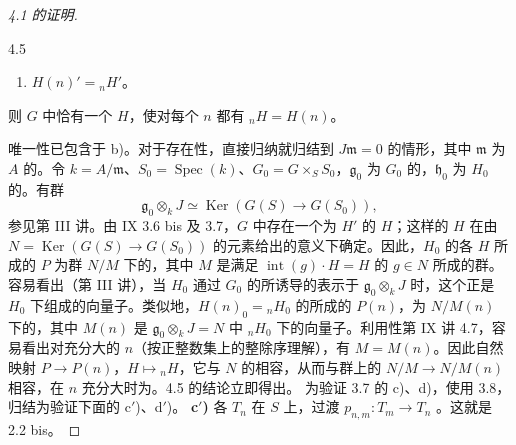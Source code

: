 \begin{proof}[ 4.1 的证明]
\begin{SGAresult}{}{4.5}
\begin{enumerate}
\item[$2^\circ$)] $H(n)'={}_nH'$。
\end{enumerate}
则 $G$ 中恰有一个 $H$，使对每个 $n$ 都有 ${}_nH=H(n)$。
\end{SGAresult}
唯一性已包含于 b)。对于存在性，直接归纳就归结到 $J\mathfrak m=0$ 的情形，其中 $\mathfrak m$ 为 $A$ 的。令 $k=A/\mathfrak m$、$S_0=\operatorname{Spec}(k)$、$G_0=G\times_S S_0$，$\mathfrak g_0$ 为 $G_0$ 的，$\mathfrak h_0$ 为 $H_0$ 的。有群
\[\mathfrak g_0\otimes_k J\simeq\operatorname{Ker}(G(S)\longrightarrow G(S_0)),\]
参见第 III 讲。由 IX 3.6 bis 及 3.7，$G$ 中存在一个为 $H'$ 的 $H$；这样的 $H$ 在由 $N=\operatorname{Ker}(G(S)\to G(S_0))$ 的元素给出的意义下确定。因此，$H_0$ 的各 $H$ 所成的 $P$ 为群 $N/M$ 下的，其中 $M$ 是满足 $\operatorname{int}(g)\cdot H=H$ 的 $g\in N$ 所成的群。
容易看出（第 III 讲），当 $H_0$ 通过 $G_0$ 的所诱导的表示于 $\mathfrak g_0\otimes_k J$ 时，这个正是 $H_0$ 下组成的向量子。类似地，$H(n)_0={}_nH_0$ 的所成的 $P(n)$，为 $N/M(n)$ 下的，其中 $M(n)$ 是 $\mathfrak g_0\otimes_k J=N$ 中 ${}_nH_0$ 下的向量子。利用性第 IX 讲 4.7，容易看出对充分大的 $n$（按正整数集上的整除序理解），有 $M=M(n)$。因此自然映射 $P\to P(n)$，$H\mapsto{}_nH$，它与 $N$ 的相容，从而与群上的 $N/M\to N/M(n)$ 相容，在 $n$ 充分大时为。4.5 的结论立即得出。
为验证 3.7 的 c)、d)，使用 3.8，归结为验证下面的 c$'$)、d$'$)。
\textbf{c$'$)} 各 $T_n$ 在 $S$ 上，过渡 $p_{n,m}:T_m\to T_n$ 。这就是 2.2 bis。

\end{proof}
